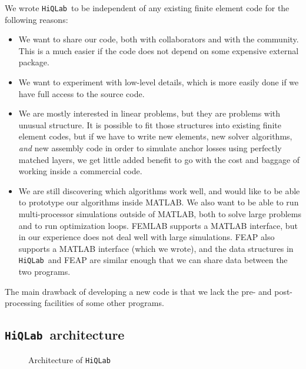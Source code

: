 \documentclass{article}
\newcommand{\hiq}{\texttt{HiQLab}}
\begin{document}
We wrote \hiq\ to be independent of any existing finite element code
for the following reasons:
\begin{itemize}

  \item We want to share our code, both with collaborators and with
  the community.  This is a much easier if the code does not depend on
  some expensive external package.

  \item We want to experiment with low-level details, which is more
  easily done if we have full access to the source code.

  \item We are mostly interested in linear problems, but they are
  problems with unusual structure.  It is possible to fit those
  structures into existing finite element codes, but if we have to
  write new elements, new solver algorithms, \emph{and} new assembly
  code in order to simulate anchor losses using perfectly matched
  layers, we get little added benefit to go with the cost and baggage
  of working inside a commercial code.

  \item We are still discovering which algorithms work well, and would
  like to be able to prototype our algorithms inside MATLAB.  We also
  want to be able to run multi-processor simulations outside of
  MATLAB, both to solve large problems and to run optimization loops.
  FEMLAB supports a MATLAB interface, but in our experience does not
  deal well with large simulations.  FEAP also supports a MATLAB
  interface (which we wrote), and the data structures in \hiq\ and
  FEAP are similar enough that we can share data between the two
  programs.

\end{itemize}

The main drawback of developing a new code is that we lack the pre-
and post-processing facilities of some other programs.


\subsection{\hiq\ architecture}

\begin{figure}
  \begin{center}
  \scalebox{1}{  }
  \end{center}
  \caption{Architecture of \hiq}
\end{figure}
\end{document}
